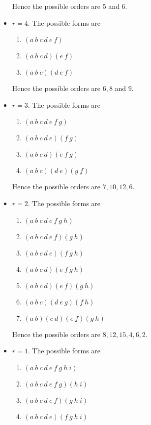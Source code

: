 \documentclass[12pt]{exam}
\theoremstyle{plain} %
\theoremstyle{definition} %
\theoremstyle{remark} %
\begin{document}
\begin{questions}
\begin{solution}
\begin{parts}
\begin{itemize}
                  Hence the possible orders are $5$ and $6$. 
         \item $r=4$. The possible forms are 
           \begin{enumerate}[label=(\roman*)]
             \item $(a\ b\ c\ d\ e\ f)$
             \item $(a\ b\ c\ d)( e\ f)$
             \item $(a\ b\ c)(d\ e\ f)$
           \end{enumerate}
           Hence the possible orders are $6, 8$ and $9$.
         \item $r=3$. The possible forms are 
           \begin{enumerate}[label=(\roman*)]
             \item $(a\ b\ c\ d\ e\ f \ g)$
             \item $(a\ b\ c\ d\ e)( f\ g)$
             \item $(a\ b\ c\ d)(e\ f\ g)$
             \item $(a\ b\ c)(d\ e)(g\ f)$
           \end{enumerate}
           Hence the possible orders are $7, 10, 12, 6$.
         \item $r=2$. The possible forms are
           \begin{enumerate}[label=(\roman*)]
             \item $(a\ b\ c\ d\ e\ f \ g\ h)$
             \item $(a\ b\ c\ d\ e\ f)( g\ h)$
             \item $(a\ b\ c\ d\ e)(f\ g\ h)$
             \item $(a\ b\ c\ d)(e\ f\ g\ h)$
             \item $(a\ b\ c\ d)( e\ f)(g\ h)$
             \item $(a\ b\ c)(d\ e\ g)(f\ h)$
             \item $(a\ b)( c\ d)( e\ f)(g\ h)$
           \end{enumerate}
           Hence the possible orders are $8, 12, 15, 4, 6, 2$.
         \item $r=1$. The possible forms are 
           \begin{enumerate}[label=(\roman*)]
             \item $(a\ b\ c\ d\ e\ f \ g\ h\ i)$
             \item $(a\ b\ c\ d\ e\ f \ g)(h\ i)$
             \item $(a\ b\ c\ d\ e\ f)(g\ h\ i)$
             \item $(a\ b\ c\ d\ e)( f\ g\ h\ i)$

\end{enumerate}
\end{itemize}
\end{parts}
\end{solution}
\end{questions}
\end{document}
